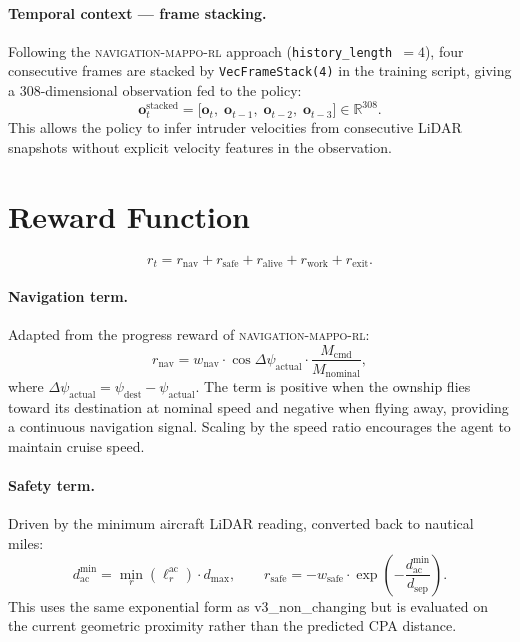 \documentclass[11pt, a4paper]{article}
\begin{document}
\paragraph{Temporal context — frame stacking.}
Following the \textsc{navigation-mappo-rl} approach (\texttt{history\_length}~$= 4$),
four consecutive frames are stacked by \texttt{VecFrameStack(4)} in the
training script, giving a 308-dimensional observation fed to the policy:
\begin{equation}
    \mathbf{o}_t^\text{stacked}
    = \bigl[\mathbf{o}_{t},\;\mathbf{o}_{t-1},\;\mathbf{o}_{t-2},\;\mathbf{o}_{t-3}\bigr]
    \in \mathbb{R}^{308}.
\end{equation}
This allows the policy to infer intruder velocities from consecutive LiDAR
snapshots without explicit velocity features in the observation.

\section{Reward Function}

\begin{equation}
    r_t = r_\text{nav} + r_\text{safe} + r_\text{alive} + r_\text{work} + r_\text{exit}.
\end{equation}

\paragraph{Navigation term.}
Adapted from the progress reward of \textsc{navigation-mappo-rl}:
\begin{equation}
    r_\text{nav}
    = w_\text{nav}\cdot\cos\Delta\psi_\text{actual}\cdot\frac{M_\text{cmd}}{M_\text{nominal}},
\end{equation}
where $\Delta\psi_\text{actual} = \psi_\text{dest} - \psi_\text{actual}$.
The term is positive when the ownship flies toward its destination at nominal
speed and negative when flying away, providing a continuous navigation signal.
Scaling by the speed ratio encourages the agent to maintain cruise speed.

\paragraph{Safety term.}
Driven by the minimum aircraft LiDAR reading, converted back to nautical miles:
\begin{equation}
    d_\text{ac}^\text{min} = \min_r(\ell^\text{ac}_r)\cdot d_\text{max},
    \qquad
    r_\text{safe} = -w_\text{safe}\cdot
        \exp\!\left(-\frac{d_\text{ac}^\text{min}}{d_\text{sep}}\right).
\end{equation}
This uses the same exponential form as v3\_non\_changing but is evaluated on
the current geometric proximity rather than the predicted CPA distance.
\end{document}
